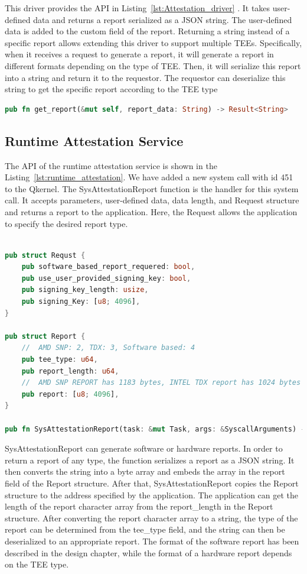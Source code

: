 This driver provides the API in Listing~\ref{lst:Attestation_driver} . It takes user-defined data and returns a report serialized as a JSON string. The user-defined data is added to the custom field of the report. Returning a string instead of a specific report allows extending this driver to support multiple TEEs. Specifically,  
when it receives a request to generate a report, it will generate a report in different formats depending on the type of TEE. Then, it will serialize this report into a string and return it to the requestor. The requestor can deserialize this string to get the specific report according to the TEE type
\begin{lstlisting}[language=rust, caption= API of attestation driver, label={lst:Attestation_driver}]
pub fn get_report(&mut self, report_data: String) -> Result<String>   
\end{lstlisting}

\subsection{Runtime Attestation Service}
The API of the runtime attestation service is shown in the Listing~\ref{lst:runtime_attestation}. We have added a new system call with id 451 to the Qkernel. The SysAttestationReport function is the handler for this system call. It accepts parameters, user-defined data, data length, and Request structure and returns a report to 
the application. Here, the Request allows the application to specify the desired report type.

\begin{lstlisting}[language=rust, caption= Interface for accessing the file type secrets, label={lst:runtime_attestation}]

pub struct Requst {
    pub software_based_report_requered: bool,
    pub use_user_provided_signing_key: bool,
    pub signing_key_length: usize, 
    pub signing_Key: [u8; 4096],  
}

pub struct Report {
    //  AMD SNP: 2, TDX: 3, Software based: 4
    pub tee_type: u64,
    pub report_length: u64,
    //  AMD SNP REPORT has 1183 bytes, INTEL TDX report has 1024 bytes
    pub report: [u8; 4096],  
}

pub fn SysAttestationReport(task: &mut Task, args: &SyscallArguments) -> Result<i64>      
\end{lstlisting}

SysAttestationReport can generate software or hardware reports. In order to return a report of any type, the function serializes a report as a JSON string. It then converts the string into a byte array and embeds the array in the report field of the Report structure. After that, SysAttestationReport copies 
the Report structure to the address specified by the application. The application can get the length of the report character array from the report\_length in the Report structure. After converting the report character array to a string, the type of the report can be determined from the tee\_type field, 
and the string can then be deserialized to an appropriate report. The format of the software report has been described in the design chapter, while the format of a hardware report depends on the TEE type.

